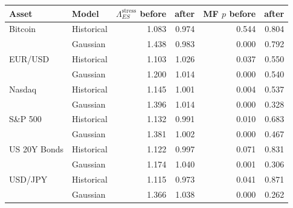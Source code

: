 \begin{tabular}{llrrrr}
\toprule
Asset & Model & $\Lambda_{ES}^{\text{stress}}$ before & after & MF $p$ before & after \\
\midrule
Bitcoin & Historical & 1.083 & 0.974 & 0.544 & 0.804 \\
 & Gaussian & 1.438 & 0.983 & 0.000 & 0.792 \\
EUR/USD & Historical & 1.103 & 1.026 & 0.037 & 0.550 \\
 & Gaussian & 1.200 & 1.014 & 0.000 & 0.540 \\
Nasdaq & Historical & 1.145 & 1.001 & 0.004 & 0.537 \\
 & Gaussian & 1.396 & 1.014 & 0.000 & 0.328 \\
S\&P 500 & Historical & 1.132 & 0.991 & 0.010 & 0.683 \\
 & Gaussian & 1.381 & 1.002 & 0.000 & 0.467 \\
US 20Y Bonds & Historical & 1.122 & 0.997 & 0.071 & 0.831 \\
 & Gaussian & 1.174 & 1.040 & 0.001 & 0.306 \\
USD/JPY & Historical & 1.115 & 0.973 & 0.041 & 0.871 \\
 & Gaussian & 1.366 & 1.038 & 0.000 & 0.262 \\
\bottomrule
\end{tabular}